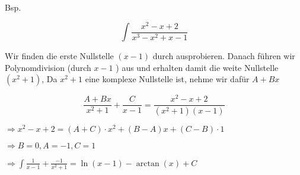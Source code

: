 \begin{example}
    Bsp.

$$
\int \frac{x^{2}-x+2}{x^{3}-x^{2}+x-1}
$$

Wir finden die erste Nullstelle $(x-1)$ durch ausprobieren. Danach führen wir Polynomdivision (durch $x-1$ ) aus und erhalten damit die weite Nullstelle $\left(x^{2}+1\right)$, Da $x^{2}+1$ eine komplexe Nullstelle ist, nehme wir dafür $A+B x$

$$
\frac{A+B x}{x^{2}+1}+\frac{C}{x-1}=\frac{x^{2}-x+2}{\left(x^{2}+1\right)(x-1)}
$$

$\Longrightarrow x^{2}-x+2=(A+C) \cdot x^{2}+(B-A) x+(C-B) \cdot 1$

$\Longrightarrow B=0, A=-1, C=1$

$\Longrightarrow \int \frac{1}{x-1}+\frac{-1}{x^{2}+1}=\ln (x-1)-\arctan (x)+C$
\end{example}



